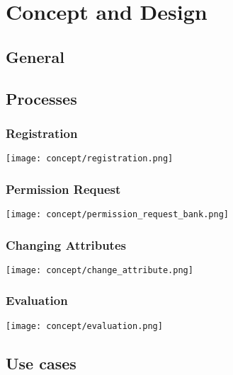 \chapter{Concept and Design}
\label{cha:conceptanddesign}

\section{General}

\section{Processes}

\subsection{Registration}

 \texttt{[image: concept/registration.png]}

\subsection{Permission Request}

 \texttt{[image: concept/permission\_request\_bank.png]}

\subsection{Changing Attributes}

 \texttt{[image: concept/change\_attribute.png]}

\subsection{Evaluation}

 \texttt{[image: concept/evaluation.png]}
 
\section{Use cases}

